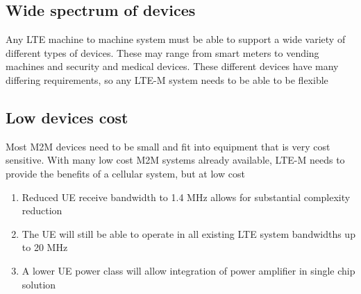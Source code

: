 \documentclass[12pt]{article}
\newcommand\tab[1][1cm]{\hspace*{#1}}
\begin{document}
\begin{description}
\subsection{Wide spectrum of devices}
\item[\label{Wide spectrum of devices}]{
\tab Any LTE machine to machine system must be able to support a wide variety of different types of devices. These may range from smart meters to vending machines and security and medical devices. These different devices have many differing requirements, so any LTE-M system needs to be able to be flexible}

\subsection{Low devices cost}
 \item[\label{Low devices cost}]{
 \tab Most M2M devices need to be small and fit into equipment that is very cost sensitive. With many low cost M2M systems already available, LTE-M needs to provide the benefits of a cellular system, but at low cost
\begin{enumerate}
\item Reduced UE receive bandwidth to 1.4 MHz allows for substantial complexity reduction
\item The UE will still be able to operate in all existing LTE system bandwidths up to 20 MHz
\item A lower UE power class will allow integration of power amplifier in single chip solution
\end{enumerate}
}

\end{description}
\end{document}
